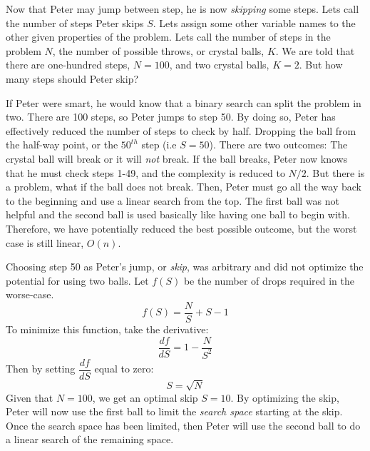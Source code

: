 \documentclass[11pt]{article}
\begin{document}
\noindent
Now that Peter may jump between step, he is now \textit{skipping} some steps. Lets call the number of steps Peter skips $S$. Lets assign some other variable names to the other given properties of the problem. Lets call the number of steps in the problem $N$, the number of possible throws, or crystal balls, $K$. We are told that there are one-hundred steps, $N = 100$, and two crystal balls, $K = 2$. But how many steps should Peter skip?

\noindent
If Peter were smart, he would know that a binary search can split the problem in two. There are 100 steps, so Peter jumps to step 50. By doing so, Peter has effectively reduced the number of steps to check by half. Dropping the ball from the half-way point, or the $50^{th}$ step (i.e $S=50$). There are two outcomes: The crystal ball will break or it will \textit{not} break. If the ball breaks, Peter now knows that he must check steps 1-49, and the complexity is reduced to $N/2$. But there is a problem, what if the ball does not break. Then, Peter must go all the way back to the beginning and use a linear search from the top. The first ball was not helpful and the second ball is used basically like having one ball to begin with. Therefore, we have potentially reduced the best possible outcome, but the worst case is still linear, $O(n)$.

\noindent
Choosing step 50 as Peter's jump, or \textit{skip}, was arbitrary and did not optimize the potential for using two balls. Let $f(S)$ be the number of drops required in the worse-case.
$$f(S) = \dfrac{N}{S} + S - 1$$
To minimize this function, take the derivative:
$$\dfrac{df}{dS} = 1 - \dfrac{N}{S^{2}}$$
Then by setting $\dfrac{df}{dS}$ equal to zero:
$$S = \sqrt{N}$$
Given that $N = 100$, we get an optimal skip $S = 10$. By optimizing the skip, Peter will now use the first ball to limit the \textit{search space} starting at the skip. Once the search space has been limited, then Peter will use the second ball to do a linear search of the remaining space.
\end{document}
